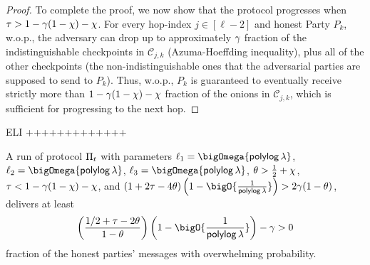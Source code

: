 \documentclass[runningheads,a4paper]{llncs}
\begin{document}
\begin{proof}
To complete the proof, we now show that the protocol progresses when $\tau > 1 - \gamma(1-\chi) - \chi$. 
For every hop-index $j \in [\ell-2]$ and honest Party $P_k$, w.o.p., 
the adversary can drop up to approximately $\gamma$ fraction of the indistinguishable checkpoints in $\mathcal{C}_{j,k}$ (Azuma-Hoeffding inequality), plus all of the other checkpoints (the non-indistinguishable ones that the adversarial parties are supposed to send to $P_k$). 
Thus, w.o.p., $P_k$ is guaranteed to eventually receive strictly more than $1 - \gamma(1-\chi) - \chi$ fraction of the onions in $\mathcal{C}_{j, k}$, which is sufficient for progressing to the next hop.  
\end{proof}

ELI +++++++++++++

\fi

\begin{theorem} \label{thm:messagedelivery} 
A run of protocol $\Pi_t$ with parameters
$\ell_1 = \bigOmega{\polylog\thinspace\secpar}$, $\ell_2 = \bigOmega{\polylog\thinspace\secpar}$, 
$\ell_3 = \bigOmega{\polylog\thinspace\secpar}$, 
$\theta > \frac{1}{2} + \chi$, 
$\tau < 1 - \gamma(1-\chi) - \chi$, and $(1 + 2\tau - 4\theta)\left(1-\bigO{\frac{1}{\polylog \thinspace\secpar}}\right) > 2\drop(1-\theta)$, 
delivers at least 
\[
\left( \frac{1/2 + \tau - 2\theta}{1-\theta}\right)\left(1-\bigO{\frac{1}{\polylog \thinspace\secpar}}\right) - \drop > 0
\]
fraction of the honest parties' messages with overwhelming probability. 
\end{theorem}
\end{document}
